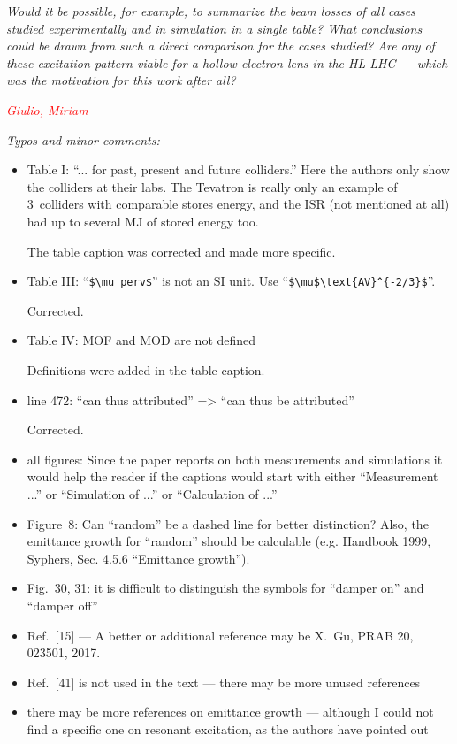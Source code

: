 \documentclass[aps
,prstab
,preprint,tightenlines
,amsfonts,amssymb,amsmath
]{revtex4-1}
\newcommand{\note}[1]{\emph{\textcolor{red}{#1}}} %
\newenvironment{co}{\em}{}
\newcommand{\bco}{\begin{co}}
\newcommand{\eco}{\end{co}}
\newenvironment{re}{\color{NavyBlue}}{}
\newcommand{\bre}{\begin{re}}
\newcommand{\ere}{\end{re}}
\begin{document}
\bco
Would it be possible, for example, to summarize the beam losses of all
cases studied experimentally and in simulation in a single table? What
conclusions could be drawn from such a direct comparison for the cases
studied? Are any of these excitation pattern viable for a hollow
electron lens in the HL-LHC --- which was the motivation for this work
after all?
\eco

\note{Giulio, Miriam}

\bco
Typos and minor comments: 
\eco

\begin{itemize}

\bco
\item Table I: ``... for past, present and future colliders.'' Here the 
authors only show the colliders at their labs. The Tevatron is really 
only an example of 3~colliders with comparable stores energy, and the 
ISR (not mentioned at all) had up to several MJ of stored energy too. 
\eco

\bre
The table caption was corrected and made more specific.
\ere

\bco
\item Table III: ``\verb!$\mu perv$!'' is not an SI unit. Use 
``\verb!$\mu$\text{AV}^{-2/3}$!''. 
\eco

\bre
Corrected.
\ere

\bco
\item Table IV: MOF and MOD are not defined 
\eco

\bre
Definitions were added in the table caption.
\ere

\bco
\item line 472: ``can thus attributed'' => ``can thus be attributed'' 
\eco

\bre
Corrected.
\ere

\bco
\item all figures: Since the paper reports on both measurements and 
simulations it would help the reader if the captions would start with 
either ``Measurement ...'' or ``Simulation of ...'' or ``Calculation of 
...'' 
\eco

\bco
\item Figure~8: Can ``random'' be a dashed line for better distinction? 
Also, the emittance growth for ``random'' should be calculable (e.g. 
Handbook 1999, Syphers, Sec. 4.5.6 ``Emittance growth''). 
\eco

\bco
\item Fig.~30, 31: it is difficult to distinguish the symbols for ``damper 
on'' and ``damper off'' 
\eco

\bco
\item Ref.~[15] --- A better or additional reference may be X.~Gu, PRAB 20, 
023501, 2017. 
\eco

\bco
\item Ref.~[41] is not used in the text --- there may be more unused 
references 
\eco

\bco
\item there may be more references on emittance growth --- although I could 
not find a specific one on resonant excitation, as the authors have 
pointed out
\eco

\end{itemize}
\end{document}
